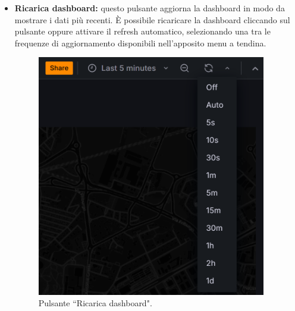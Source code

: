 \documentclass[8pt]{article}
\begin{document}
\begin{itemize}
\begin{figure}[H]
    \end{figure}
    \item \textbf{Ricarica dashboard:} questo pulsante aggiorna la dashboard in modo da mostrare i dati più recenti. È possibile ricaricare la dashboard cliccando sul pulsante oppure attivare il refresh automatico, selezionando una tra le frequenze di aggiornamento disponibili nell'apposito menu a tendina.
    \begin{figure}[H]
        \centering
        \includegraphics[width=10cm]{images_mu/refresh.png}
        \caption{Pulsante ``Ricarica dashboard".}
        \label{fig:Pulsante ``Ricarica dashboard"}
    \end{figure}
\end{itemize}
\end{document}
